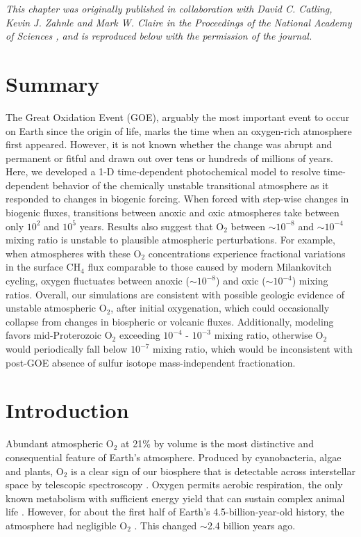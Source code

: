 \noindent \textit{This chapter was originally published in collaboration with David C. Catling, Kevin J. Zahnle and Mark W. Claire in the Proceedings of the National Academy of Sciences \citep{Wogan_2022}, and is reproduced below with the permission of the journal.}

\section*{\centering Summary}

The Great Oxidation Event (GOE), arguably the most important event to occur on Earth since the origin of life, marks the time when an oxygen-rich atmosphere first appeared. However, it is not known whether the change was abrupt and permanent or fitful and drawn out over tens or hundreds of millions of years. Here, we developed a 1-D time-dependent photochemical model to resolve time-dependent behavior of the chemically unstable transitional atmosphere as it responded to changes in biogenic forcing. When forced with step-wise changes in biogenic fluxes, transitions between anoxic and oxic atmospheres take between only $10^2$ and $10^5$ years. Results also suggest that O$_2$ between $\sim10^{-8}$ and $\sim10^{-4}$ mixing ratio is unstable to plausible atmospheric perturbations. For example, when atmospheres with these O$_2$ concentrations experience fractional variations in the surface CH$_4$ flux comparable to those caused by modern Milankovitch cycling, oxygen fluctuates between anoxic ($\sim10^{-8}$) and oxic ($\sim10^{-4}$) mixing ratios. Overall, our simulations are consistent with possible geologic evidence of unstable atmospheric O$_2$, after initial oxygenation, which could occasionally collapse from changes in biospheric or volcanic fluxes. Additionally, modeling favors mid-Proterozoic O$_2$ exceeding $10^{-4}$ - $10^{-3}$ mixing ratio, otherwise O$_2$ would periodically fall below $10^{-7}$ mixing ratio, which would be inconsistent with post-GOE absence of sulfur isotope mass-independent fractionation.

\section{Introduction}

Abundant atmospheric O$_2$ at 21\% by volume is the most distinctive and consequential feature of Earth's atmosphere. Produced by cyanobacteria, algae and plants, O$_2$ is a clear sign of our biosphere that is detectable across interstellar space by telescopic spectroscopy \citep{Meadows_2018}. Oxygen permits aerobic respiration, the only known metabolism  with sufficient energy yield that can sustain complex animal life \citep{Catling_2005}. However, for about the first half of Earth's 4.5-billion-year-old history, the atmosphere had negligible O$_2$ \citep[e.g.][]{Catling_2020}. This changed $\sim$2.4 billion years ago.

